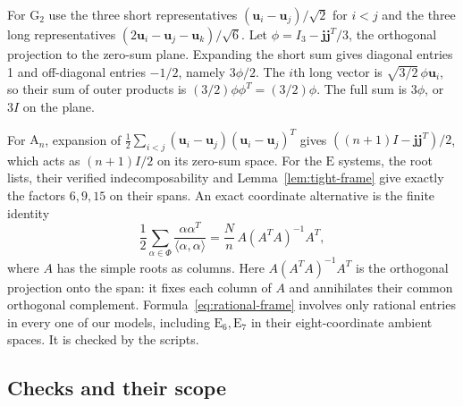 \documentclass[11pt]{amsart}
\newcommand\Zu{{\mathbf u}}
\newcommand\Zj{{\mathbf j}}
\newcommand\inv{^{-1}}
\newcommand\ip[2]{\langle#1,#2\rangle}
\theoremstyle{definition}
\newcommand{\typ}[1]{\mathrm{#1}}
\newcommand{\lsq}[1]{\ip{#1}{#1}}
\begin{document}
For $\typ G_2$ use the three short representatives
$(\Zu_i-\Zu_j)/\sqrt2$ for $i<j$ and the three long representatives
$(2\Zu_i-\Zu_j-\Zu_k)/\sqrt6$. Let
$\phi=I_3-\Zj\Zj^T/3$, the orthogonal projection to the zero-sum plane.
Expanding the short sum gives diagonal entries 1 and off-diagonal
entries $-1/2$, namely $3\phi/2$. The $i$th long vector is
$\sqrt{3/2}\,\phi\Zu_i$, so their sum of outer products is
$(3/2)\phi\phi^T=(3/2)\phi$. The full sum is $3\phi$, or $3I$ on the plane.

For $\typ A_n$, expansion of
$\frac12\sum_{i<j}(\Zu_i-\Zu_j)(\Zu_i-\Zu_j)^T$ gives
$((n+1)I-\Zj\Zj^T)/2$, which acts as $(n+1)I/2$ on its zero-sum
space. For the $\typ E$ systems, the root lists, their verified
indecomposability and Lemma~\ref{lem:tight-frame} give exactly the
factors $6,9,15$ on their spans. An exact coordinate alternative is the
finite identity
\begin{equation}\label{eq:rational-frame}
 \frac12\sum_{\alpha\in\Phi}\frac{\alpha\alpha^T}{\lsq{\alpha}}
     =\frac{N}{n}\,A(A^TA)\inv A^T,
\end{equation}
where $A$ has the simple roots as columns. Here $A(A^TA)\inv A^T$ is
the orthogonal projection onto the span: it fixes each column of $A$
and annihilates their common orthogonal
complement. Formula~\eqref{eq:rational-frame} involves only rational
entries in every one of our models, including $\typ E_6,\typ E_7$ in
their eight-coordinate ambient spaces. It is checked by the scripts.

\subsection{Checks and their scope}\label{sec:checks}
\end{document}
